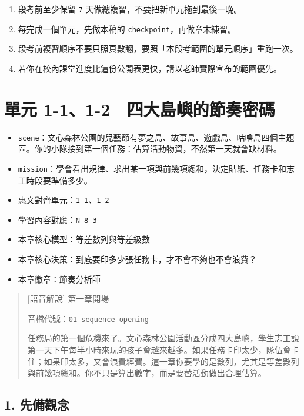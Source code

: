 \documentclass[
  chinese,
  12pt,
  a4paper,
  oneside]{article}
\providecommand{\tightlist}{%
  \setlength{\itemsep}{0pt}\setlength{\parskip}{0pt}}
\begin{document}
\begin{enumerate}
\def\labelenumi{\arabic{enumi}.}
\tightlist
\item
  段考前至少保留 \texttt{7} 天做總複習，不要把新單元拖到最後一晚。
\item
  每完成一個單元，先做本稿的 \texttt{checkpoint}，再做章末練習。
\item
  段考前複習順序不要只照頁數翻，要照「本段考範圍的單元順序」重跑一次。
\item
  若你在校內課堂進度比這份公開表更快，請以老師實際宣布的範圍優先。
\end{enumerate}

\newpage

\section{單元
1-1、1-2　四大島嶼的節奏密碼}\label{ux55aeux5143-1-11-2-ux56dbux5927ux5cf6ux5dbcux7684ux7bc0ux594fux5bc6ux78bc}

\begin{itemize}
\tightlist
\item
  \texttt{scene}：文心森林公園的兒藝節有夢之島、故事島、遊戲島、咕嚕島四個主題區。你的小隊接到第一個任務：估算活動物資，不然第一天就會缺材料。
\item
  \texttt{mission}：學會看出規律、求出某一項與前幾項總和，決定貼紙、任務卡和志工時段要準備多少。
\item
  惠文對齊單元：\texttt{1-1}、\texttt{1-2}
\item
  學習內容對應：\texttt{N-8-3}
\item
  本章核心模型：等差數列與等差級數
\item
  本章核心決策：到底要印多少張任務卡，才不會不夠也不會浪費？
\item
  本章徽章：節奏分析師
\end{itemize}

\begin{quote}
{[}語音解說{]} 第一章開場

音檔代號：\texttt{01-sequence-opening}

任務局的第一個危機來了。文心森林公園活動區分成四大島嶼，學生志工說第一天下午每半小時來玩的孩子會越來越多。如果任務卡印太少，隊伍會卡住；如果印太多，又會浪費經費。這一章你要學的是數列，尤其是等差數列與前幾項總和。你不只是算出數字，而是要替活動做出合理估算。
\end{quote}

\subsection{1. 先備觀念}\label{ux5148ux5099ux89c0ux5ff5}
\end{document}
